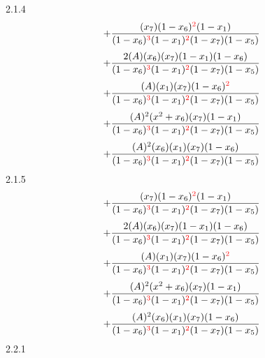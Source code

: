 \documentclass{article}
\begin{document}
2.1.4
\[+\frac{(x_7)(1-x_6)^{\textcolor{red}{2}}(1-x_1)}{(1-x_6)^{\textcolor{red}{3}}(1-x_1)^{\textcolor{red}{2}}(1-x_7)(1-x_5)}\]\[+\frac{2(A)(x_6)(x_7)(1-x_1)(1-x_6)}{(1-x_6)^{\textcolor{red}{3}}(1-x_1)^{\textcolor{red}{2}}(1-x_7)(1-x_5)}\]\[+\frac{(A)(x_1)(x_7)(1-x_6)^{\textcolor{red}{2}}}{(1-x_6)^{\textcolor{red}{3}}(1-x_1)^{\textcolor{red}{2}}(1-x_7)(1-x_5)}\]\[+\frac{(A)^{2}(x^{2}+x_6)(x_7)(1-x_1)}{(1-x_6)^{\textcolor{red}{3}}(1-x_1)^{\textcolor{red}{2}}(1-x_7)(1-x_5)}\]\[+\frac{(A)^{2}(x_6)(x_1)(x_7)(1-x_6)}{(1-x_6)^{\textcolor{red}{3}}(1-x_1)^{\textcolor{red}{2}}(1-x_7)(1-x_5)}\]
2.1.5
\[+\frac{(x_7)(1-x_6)^{\textcolor{red}{2}}(1-x_1)}{(1-x_6)^{\textcolor{red}{3}}(1-x_1)^{\textcolor{red}{2}}(1-x_7)(1-x_5)}\]\[+\frac{2(A)(x_6)(x_7)(1-x_1)(1-x_6)}{(1-x_6)^{\textcolor{red}{3}}(1-x_1)^{\textcolor{red}{2}}(1-x_7)(1-x_5)}\]\[+\frac{(A)(x_1)(x_7)(1-x_6)^{\textcolor{red}{2}}}{(1-x_6)^{\textcolor{red}{3}}(1-x_1)^{\textcolor{red}{2}}(1-x_7)(1-x_5)}\]\[+\frac{(A)^{2}(x^{2}+x_6)(x_7)(1-x_1)}{(1-x_6)^{\textcolor{red}{3}}(1-x_1)^{\textcolor{red}{2}}(1-x_7)(1-x_5)}\]\[+\frac{(A)^{2}(x_6)(x_1)(x_7)(1-x_6)}{(1-x_6)^{\textcolor{red}{3}}(1-x_1)^{\textcolor{red}{2}}(1-x_7)(1-x_5)}\]
2.2.1
\end{document}
